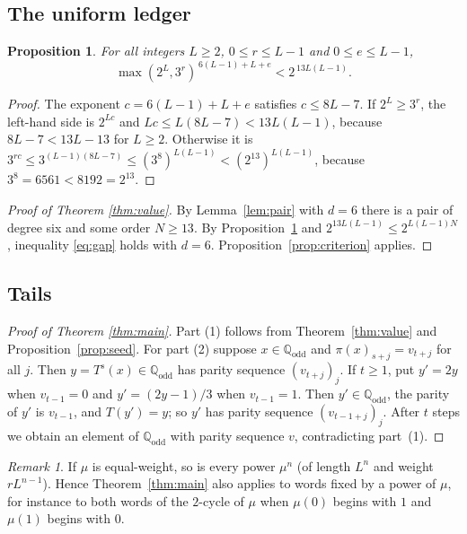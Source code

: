 \documentclass[11pt,reqno]{amsart}
\newtheorem{proposition}[theorem]{Proposition}
\theoremstyle{definition}
\theoremstyle{remark}
\newtheorem{remark}[theorem]{Remark}
\newcommand{\Qodd}{\mathbb{Q}_{\mathrm{odd}}}
\begin{document}
\subsection{The uniform ledger}

\begin{proposition}\label{prop:ledger}
For all integers $L\ge 2$, $0\le r\le L-1$ and $0\le e\le L-1$,
\[
  \max(2^{L},3^{r})^{\,6(L-1)+L+e}<2^{\,13L(L-1)} .
\]
\end{proposition}

\begin{proof}
The exponent $c=6(L-1)+L+e$ satisfies $c\le 8L-7$.  If $2^{L}\ge 3^{r}$, the
left-hand side is $2^{Lc}$ and $Lc\le L(8L-7)<13L(L-1)$, because
$8L-7<13L-13$ for $L\ge 2$.  Otherwise it is
$3^{rc}\le 3^{(L-1)(8L-7)}\le(3^{8})^{L(L-1)}<(2^{13})^{L(L-1)}$, because
$3^{8}=6561<8192=2^{13}$.
\end{proof}

\begin{proof}[Proof of Theorem \ref{thm:value}]
By Lemma~\ref{lem:pair} with $d=6$ there is a pair of degree six and some
order $N\ge 13$.  By Proposition~\ref{prop:ledger} and
$2^{13L(L-1)}\le 2^{L(L-1)N}$, inequality \eqref{eq:gap} holds with $d=6$.
Proposition~\ref{prop:criterion} applies.
\end{proof}

\subsection{Tails}

\begin{proof}[Proof of Theorem \ref{thm:main}]
Part (1) follows from Theorem~\ref{thm:value} and
Proposition~\ref{prop:seed}.  For part (2) suppose $x\in\Qodd$ and
$\pi(x)_{s+j}=v_{t+j}$ for all $j$.  Then $y=T^{s}(x)\in\Qodd$ has parity
sequence $(v_{t+j})_j$.  If $t\ge 1$, put $y'=2y$ when $v_{t-1}=0$ and
$y'=(2y-1)/3$ when $v_{t-1}=1$.  Then $y'\in\Qodd$, the parity of $y'$ is
$v_{t-1}$, and $T(y')=y$; so $y'$ has parity sequence $(v_{t-1+j})_j$.
After $t$ steps we obtain an element of $\Qodd$ with parity sequence $v$,
contradicting part~(1).
\end{proof}

\begin{remark}\label{rem:powers}
If $\mu$ is equal-weight, so is every power $\mu^{n}$ (of length $L^{n}$
and weight $rL^{n-1}$).  Hence Theorem~\ref{thm:main} also applies to words
fixed by a power of $\mu$, for instance to both words of the $2$-cycle of
$\mu$ when $\mu(0)$ begins with $1$ and $\mu(1)$ begins with $0$.
\end{remark}
\end{document}

